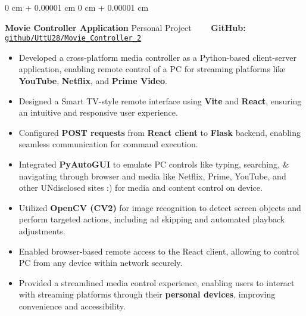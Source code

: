 \documentclass[10pt, letterpaper]{article}
\newenvironment{highlights}{
    \begin{itemize}[
        topsep=0.10 cm,
        parsep=0.10 cm,
        partopsep=0pt,
        itemsep=0pt,
        leftmargin=0 cm + 10pt
    ]
}{
    \end{itemize}
} %
\newenvironment{onecolentry}{
    \begin{adjustwidth}{
        0 cm + 0.00001 cm
    }{
        0 cm + 0.00001 cm
    }
}{
    \end{adjustwidth}
} %
\begin{document}
\vspace{0.15 cm}

\begin{onecolentry}
	\textbf{Movie Controller Application} \hfill Personal Project \ \ \ \ \textbf{GitHub:} \href{https://github.com/UttU28/Movie_Controller_2}{\texttt{github/UttU28/Movie\_Controller\_2}}
	\begin{highlights}
		\item Developed a cross-platform media controller as a Python-based client-server application, enabling remote control of a PC for streaming platforms like \textbf{YouTube}, \textbf{Netflix}, and \textbf{Prime Video}.
		\item Designed a Smart TV-style remote interface using \textbf{Vite} and \textbf{React}, ensuring an intuitive and responsive user experience.
		\item Configured \textbf{POST requests} from \textbf{React client} to \textbf{Flask} backend, enabling seamless communication for command execution.
		\item Integrated \textbf{PyAutoGUI} to emulate PC controls like typing, searching, \& navigating through browser and media like Netflix, Prime, YouTube, and other UNdisclosed sites :) for media and content control on device.
		\item Utilized \textbf{OpenCV (CV2)} for image recognition to detect screen objects and perform targeted actions, including ad skipping and automated playback adjustments.
		\item Enabled browser-based remote access to the React client, allowing to control PC from any device within network securely.
		\item Provided a streamlined media control experience, enabling users to interact with streaming platforms through their \textbf{personal devices}, improving convenience and accessibility.
	\end{highlights}
\end{onecolentry}
\end{document}
